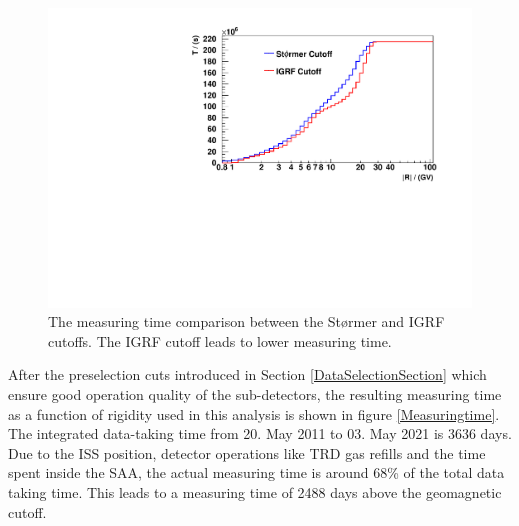 \begin{figure}[htpb]
\centering
\includegraphics[width=1.0\textwidth, height=0.41\textheight]{Figures/chapter4/MeasuringTime/IGRFvsStomer.pdf}
\caption[The measuring time comparison between the Størmer and IGRF cutoffs.]{The measuring time comparison between the Størmer and IGRF cutoffs. The IGRF cutoff leads to lower measuring time.}
\label{IGRFvsStomer}
\end{figure}

After the preselection cuts introduced in Section \ref{DataSelectionSection} which ensure good operation quality of the sub-detectors, the resulting measuring time as a function of rigidity used in this analysis is shown in figure \ref{Measuringtime}. The integrated data-taking time from 20. May 2011 to 03. May 2021 is 3636 days. Due to the ISS position, detector operations like TRD gas refills and the time spent inside the SAA, the actual measuring time is around 68\% of the total data taking time. This leads to a measuring time of 2488 days above the geomagnetic cutoff.  %

